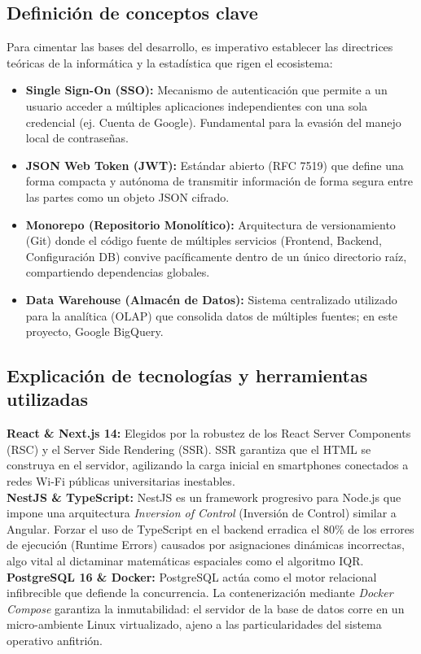 \documentclass[12pt, a4paper]{article}
\begin{document}
\subsection{Definición de conceptos clave}
Para cimentar las bases del desarrollo, es imperativo establecer las directrices teóricas de la informática y la estadística que rigen el ecosistema:
\begin{itemize}
    \item \textbf{Single Sign-On (SSO):} Mecanismo de autenticación que permite a un usuario acceder a múltiples aplicaciones independientes con una sola credencial (ej. Cuenta de Google). Fundamental para la evasión del manejo local de contraseñas.
    \item \textbf{JSON Web Token (JWT):} Estándar abierto (RFC 7519) que define una forma compacta y autónoma de transmitir información de forma segura entre las partes como un objeto JSON cifrado. 
    \item \textbf{Monorepo (Repositorio Monolítico):} Arquitectura de versionamiento (Git) donde el código fuente de múltiples servicios (Frontend, Backend, Configuración DB) convive pacíficamente dentro de un único directorio raíz, compartiendo dependencias globales.
    \item \textbf{Data Warehouse (Almacén de Datos):} Sistema centralizado utilizado para la analítica (OLAP) que consolida datos de múltiples fuentes; en este proyecto, Google BigQuery.
\end{itemize}

\subsection{Explicación de tecnologías y herramientas utilizadas}
\textbf{React \& Next.js 14:} Elegidos por la robustez de los React Server Components (RSC) y el Server Side Rendering (SSR). SSR garantiza que el HTML se construya en el servidor, agilizando la carga inicial en smartphones conectados a redes Wi-Fi públicas universitarias inestables.\\
\textbf{NestJS \& TypeScript:} NestJS es un framework progresivo para Node.js que impone una arquitectura \textit{Inversion of Control} (Inversión de Control) similar a Angular. Forzar el uso de TypeScript en el backend erradica el 80\% de los errores de ejecución (Runtime Errors) causados por asignaciones dinámicas incorrectas, algo vital al dictaminar matemáticas espaciales como el algoritmo IQR.\\
\textbf{PostgreSQL 16 \& Docker:} PostgreSQL actúa como el motor relacional infibrecible que defiende la concurrencia. La contenerización mediante \textit{Docker Compose} garantiza la inmutabilidad: el servidor de la base de datos corre en un micro-ambiente Linux virtualizado, ajeno a las particularidades del sistema operativo anfitrión.
\end{document}
